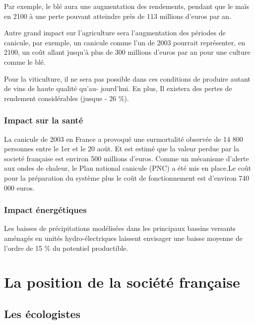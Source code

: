 \documentclass[a4paper,10pt]{article}
\begin{document}
Par exemple, le blé aura une augmentation des rendements, pendant que le maïs en 2100
à une perte pouvant atteindre près de 113 millions d’euros par an.

Autre  grand  impact  sur  l'agriculture  sera l'augmentation  des  périodes  de
canicule, par exemple,  un canicule comme l'un de  2003 pourrait représenter, en
2100,  un coût  allant jusqu’à  plus de  300 millions  d’euros par  an  pour une
culture comme le blé.  

Pour la viticulture, il ne sera pas
possible dans ces conditions de produire autant de vins de haute qualité qu’au-
jourd’hui. En plus, Il existera des pertes de rendement considérables (jusque - 26 \%).

\subsubsection*{Impact sur la santé }
La canicule de 2003 en France a provoqué une surmortalité observée de 14 800
personnes entre le 1er et le 20 août.  Et est estimé que la valeur perdue par la
societé française est environ 500 millions d’euros.
Comme un mécanisme d'alerte aux ondes de chaleur, le Plan national canicule
(PNC) a été mis en place.Le coût  pour la préparation du système plus le coût de
fonctionnement est d'environ 740 000 euros. 

\subsubsection*{Impact énergétiques}

Les baisses de précipitations modélisées dans les principaux bassins versants
aménagés en unités hydro-électriques laissent envisager une baisse moyenne de
l’ordre de 15 \% du potentiel productible.

\section{La position de la société française}
\subsection{Les écologistes}
\end{document}
